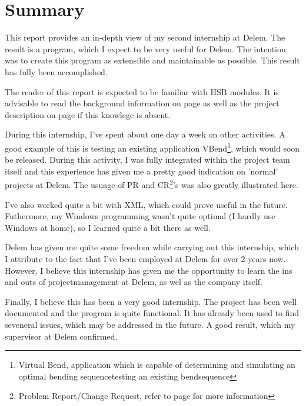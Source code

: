 \chapter{Summary}

This report provides an in-depth view of my second internship at Delem. The result is a program, which I expect to be very useful for Delem. The intention was to create this program as extensible and maintainable as possible. This result has fully been accomplished.

The reader of this report is expected to be familiar with HSB modules. It is advisable to read the background information on page \pageref{achtergrondinfo} as well as the project description on page \pageref{project} if this knowlege is absent.

During this internship, I've spent about one day a week on other activities. A good example of this is testing an existing application VBend\footnote{Virtual Bend, application which is capable of determining and simulating an optimal bending sequencetesting an existing bendsequence}, which would soon be released. During this activity, I was fully integrated within the project team itself and this experience has given me a pretty good indication on 'normal' projects at Delem. The usuage of PR and CR\footnote{Problem Report/Change Request, refer to page \pageref{PR} for more information}'s was also greatly illustrated here.

I've also worked quite a bit with XML, which could prove useful in the future. Futhermore, my Windows programming wasn't quite optimal (I hardly use Windows at home), so I learned quite a bit there as well.

Delem has given me quite some freedom while carrying out this internship, which I attribute to the fact that I've been employed at Delem for over 2 years now. However, I believe this internship has given me the opportunity to learn the ins and outs of projectmanagement at Delem, as wel as the company itself.

Finally, I believe this has been a very good internship. The project has been well documented and the program is quite functional. It has already been used to find seveneral issues, which may be addressed in the future. A good result, which my supervisor at Delem confirmed.

